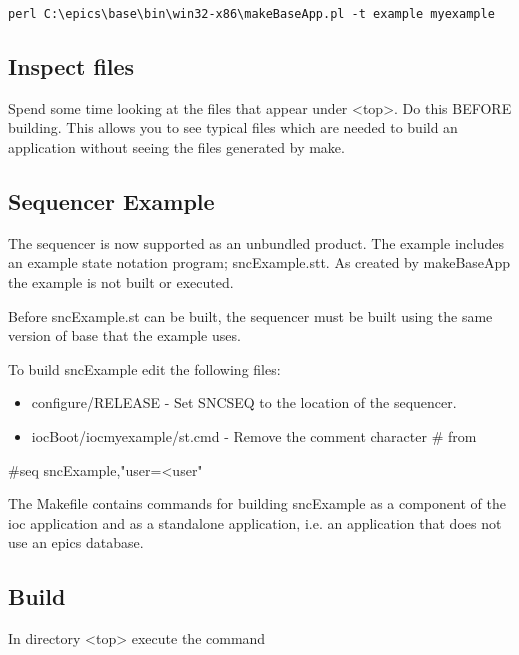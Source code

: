 \begin{verbatim}perl C:\epics\base\bin\win32-x86\makeBaseApp.pl -t example myexample
\end{verbatim}\subsection{Inspect files}

Spend some time looking at the files that appear under \textless{}top\textgreater{}. Do this BEFORE building. This allows you to see typical 
files which are needed to build an application without seeing the files generated by make.

\subsection{Sequencer Example}

The sequencer is now supported as an unbundled product. The example includes an example state notation program; 
sncExample.stt. As created by makeBaseApp the example is not built or executed.

Before sncExample.st can be built, the sequencer must be built using the same version of base that the example uses.

To build sncExample edit the following files:

\begin{itemize}\item configure/RELEASE - Set SNCSEQ to the location of the sequencer.

\item iocBoot/iocmyexample/st.cmd - Remove the comment character \# from

\end{itemize}\begin{description}\item          \#seq sncExample,"user=\textless{}user"

\end{description}The Makefile contains commands for building sncExample as a component of the ioc application and as a standalone 
application, i.e. an application that does not use an epics database.

\subsection{Build}

In directory \textless{}top\textgreater{} execute the command

